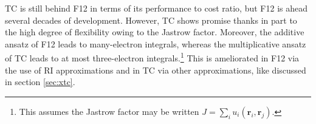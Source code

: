 TC is still behind F12 in terms of its performance to cost ratio, but F12 is ahead several decades of development. However, TC shows promise thanks in part to the high degree of flexibility owing to the Jastrow factor. Moreover, the additive ansatz of F12 leads to many-electron integrals, whereas the multiplicative ansatz of TC leads to at most three-electron integrals.\footnote{This assumes the Jastrow factor may be written $J=\sum_iu_i(\bm r_i, \bm r_j)$.} This is ameliorated in F12 via the use of \gls{RI} approximations and in TC via other approximations, like discussed in section \ref{sec:xtc}.
